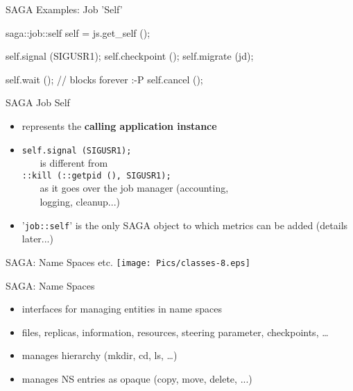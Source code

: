 \documentclass[%
  pdf,
  colorBG,
  slideColor,
  frames,
  ogf
]{prosper}
\newcommand{\T}[1]{\texttt{#1}}
\newcommand{\B}[1]{\textbf{#1}}
\newcommand{\dn}{\vspace*{+1em}}
\begin{document}
 
 \begin{slide}{SAGA Examples: Job 'Self'}
 
  \begin{mycode}[label=jobs (cont.)]
 
  saga::job::self self = js.get_self ();
 
  self.signal     (SIGUSR1);
  self.checkpoint ();
  self.migrate    (jd);
  
  self.wait   ();   // blocks forever :-P
  self.cancel ();
 
  \end{mycode}
   
 \end{slide}



 \begin{slide}{SAGA Job Self}

  \dn

  \begin{itemize}

   \item represents the \B{calling application instance}
   \item \T{self.signal (SIGUSR1);}\\
         ~~~ is different from\\ 
         \T{::kill (::getpid (), SIGUSR1);}\\
         ~~~ as it goes over the job manager (accounting,\\
         ~~~ logging, cleanup...)
   \item '\T{job::self}' is the only SAGA object to which metrics can be added
   (details later...)

  \end{itemize}

 \end{slide}


 \begin{slide}{SAGA: Name Spaces etc.}
   \texttt{[image: Pics/classes-8.eps]}
 \end{slide}


 \begin{slide}{SAGA: Name Spaces}

 \dn 

  \begin{itemize}
   \item interfaces for managing entities in name spaces
   \item files, replicas, information, resources, steering parameter,
         checkpoints, \dots
   \item manages hierarchy (mkdir, cd, ls, \dots)
   \item manages NS entries as opaque (copy, move, delete, ...)
  \end{itemize}

 \end{slide}
\end{document}
